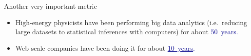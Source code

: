 \documentclass[aspectratio=169]{beamer}
\begin{document}
\begin{frame}{Another very important metric}
\Large
\vspace{0.25 cm}
\begin{itemize}
\item High-energy physicists have been performing big data analytics (i.e.\ reducing large datasets to statistical inferences with computers) for about \textcolor{darkblue}{\underline{50~years}.}
\item<2-> Web-scale companies have been doing it for about \textcolor{darkblue}{\underline{10~years}.}
\end{itemize}

\vspace{0.5 cm}

\vspace{0.5 cm}

\vspace{0.2 cm}
\end{frame}
\end{document}
